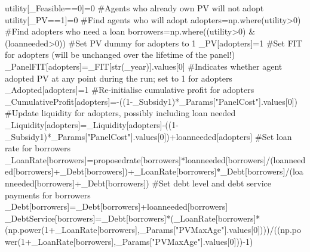 \documentclass[
  letterpaper,
  DIV=11,
  numbers=noendperiod]{scrartcl}
\newenvironment{Shaded}{\begin{snugshade}}{\end{snugshade}}
\newcommand{\BuiltInTok}[1]{\textcolor[rgb]{0.00,0.23,0.31}{#1}}
\newcommand{\CommentTok}[1]{\textcolor[rgb]{0.37,0.37,0.37}{#1}}
\newcommand{\DecValTok}[1]{\textcolor[rgb]{0.68,0.00,0.00}{#1}}
\newcommand{\NormalTok}[1]{\textcolor[rgb]{0.00,0.23,0.31}{#1}}
\newcommand{\OperatorTok}[1]{\textcolor[rgb]{0.37,0.37,0.37}{#1}}
\newcommand{\StringTok}[1]{\textcolor[rgb]{0.13,0.47,0.30}{#1}}
\begin{document}
\begin{Shaded}
\begin{Highlighting}[]
\NormalTok{    utility[\_Feasible}\OperatorTok{==}\DecValTok{0}\NormalTok{]}\OperatorTok{=}\DecValTok{0}
    \CommentTok{\#Agents who already own PV will not adopt}
\NormalTok{    utility[\_PV}\OperatorTok{==}\DecValTok{1}\NormalTok{]}\OperatorTok{=}\DecValTok{0}
    \CommentTok{\#Find agents who will adopt}
\NormalTok{    adopters}\OperatorTok{=}\NormalTok{np.where(utility}\OperatorTok{\textgreater{}}\DecValTok{0}\NormalTok{)}
    \CommentTok{\#Find adopters who need a loan}
\NormalTok{    borrowers}\OperatorTok{=}\NormalTok{np.where((utility}\OperatorTok{\textgreater{}}\DecValTok{0}\NormalTok{) }\OperatorTok{\&}\NormalTok{ (loanneeded}\OperatorTok{\textgreater{}}\DecValTok{0}\NormalTok{))}
    \CommentTok{\#Set PV dummy for adopters to 1}
\NormalTok{    \_PV[adopters]}\OperatorTok{=}\DecValTok{1}
    \CommentTok{\#Set FIT for adopters (will be unchanged over the lifetime of the panel!)}
\NormalTok{    \_PanelFIT[adopters]}\OperatorTok{=}\NormalTok{\_FIT[}\BuiltInTok{str}\NormalTok{(\_year)].values[}\DecValTok{0}\NormalTok{]}
    \CommentTok{\#Indicates whether agent adopted PV at any point during the run; set to 1 for adopters}
\NormalTok{    \_Adopted[adopters]}\OperatorTok{=}\DecValTok{1}
    \CommentTok{\#Re{-}initialise cumulative profit for adopters}
\NormalTok{    \_CumulativeProfit[adopters]}\OperatorTok{={-}}\NormalTok{((}\DecValTok{1}\OperatorTok{{-}}\NormalTok{\_Subsidy1)}\OperatorTok{*}\NormalTok{\_Params[}\StringTok{"PanelCost"}\NormalTok{].values[}\DecValTok{0}\NormalTok{])}
    \CommentTok{\#Update liquidity for adopters, possibly including loan needed}
\NormalTok{    \_Liquidity[adopters]}\OperatorTok{=}\NormalTok{\_Liquidity[adopters]}\OperatorTok{{-}}\NormalTok{((}\DecValTok{1}\OperatorTok{{-}}\NormalTok{\_Subsidy1)}\OperatorTok{*}\NormalTok{\_Params[}\StringTok{"PanelCost"}\NormalTok{].values[}\DecValTok{0}\NormalTok{])}\OperatorTok{+}\NormalTok{loanneeded[adopters]}
    \CommentTok{\#Set loan rate for borrowers}
\NormalTok{    \_LoanRate[borrowers]}\OperatorTok{=}\NormalTok{proposedrate[borrowers]}\OperatorTok{*}\NormalTok{loanneeded[borrowers]}\OperatorTok{/}\NormalTok{(loanneeded[borrowers]}\OperatorTok{+}\NormalTok{\_Debt[borrowers])}\OperatorTok{+}\NormalTok{\_LoanRate[borrowers]}\OperatorTok{*}\NormalTok{\_Debt[borrowers]}\OperatorTok{/}\NormalTok{(loanneeded[borrowers]}\OperatorTok{+}\NormalTok{\_Debt[borrowers])}
    \CommentTok{\#Set debt level and debt service payments for borrowers}
\NormalTok{    \_Debt[borrowers]}\OperatorTok{=}\NormalTok{\_Debt[borrowers]}\OperatorTok{+}\NormalTok{loanneeded[borrowers]}
\NormalTok{    \_DebtService[borrowers]}\OperatorTok{=}\NormalTok{\_Debt[borrowers]}\OperatorTok{*}\NormalTok{(\_LoanRate[borrowers]}\OperatorTok{*}\NormalTok{(np.power(}\DecValTok{1}\OperatorTok{+}\NormalTok{\_LoanRate[borrowers],\_Params[}\StringTok{"PVMaxAge"}\NormalTok{].values[}\DecValTok{0}\NormalTok{])))}\OperatorTok{/}\NormalTok{((np.power(}\DecValTok{1}\OperatorTok{+}\NormalTok{\_LoanRate[borrowers],\_Params[}\StringTok{"PVMaxAge"}\NormalTok{].values[}\DecValTok{0}\NormalTok{]))}\OperatorTok{{-}}\DecValTok{1}\NormalTok{)}

\end{Highlighting}
\end{Shaded}
\end{document}
